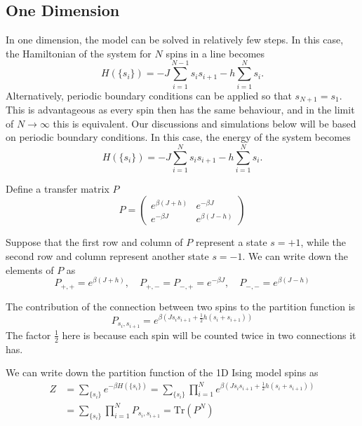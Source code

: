 \documentclass[11pt]{article}
\begin{document}
	\subsection{One Dimension}
	
	In one dimension, the model can be solved in relatively few steps. In this case, the Hamiltonian of the system for $N$ spins in a line becomes
	\begin{equation}
		H(\{s_i\}) = -J \sum_{i=1}^{N-1} s_i s_{i+1} -h\sum_{i=1}^N s_i.
	\end{equation}
	Alternatively, periodic boundary conditions can be applied so that $s_{N+1} = s_1$. This is advantageous as every spin then has the same behaviour, and in the limit of $N \to \infty$ this is equivalent. Our discussions and simulations below will be based on periodic boundary conditions. In this case, the energy of the system becomes
	\begin{equation} \label{eq:Energy1D}
		H(\{s_i\}) = -J \sum_{i=1}^{N} s_i s_{i+1} -h\sum_{i=1}^N s_i.
	\end{equation}

	Define a transfer matrix $P$
	\begin{equation} \label{eq:MatrixP}
		P = \begin{pmatrix}
			e^{\beta(J+h)} & e^{-\beta J} \\
			e^{-\beta J} & e^{\beta(J-h)}
		\end{pmatrix}
	\end{equation}

	Suppose that the first row and column of $P$ represent a state $s = +1$, while the second row and column represent another state $s = -1$. We can write down the elements of $P$ as
	\begin{equation} \label{eq:MatrixPElements}
		P_{+,+} = e^{\beta(J+h)}, \quad P_{+,-} = P_{-,+} = e^{-\beta J}, \quad P_{-,-} = e^{\beta(J-h)}
	\end{equation}

	The contribution of the connection between two spins to the partition function is
	\begin{equation} \label{eq:PartitionFunction1DGeneral2SpinsConnection}
		P_{s_i, s_{i+1}} = e^{\beta(J s_i s_{i+1} + \frac12h(s_i + s_{i+1}))}
	\end{equation}
	The factor $\frac12$ here is because each spin will be counted twice in two connections it has.

	We can write down the partition function of the 1D Ising model spins as
	\begin{equation} \label{eq:PartitionFunction1DGeneral}
		\begin{aligned}
			Z &= \sum_{\{s_i\}} e^{-\beta H(\{s_i\})} = \sum_{\{s_i\}} \prod_{i=1}^{N} e^{\beta(J s_i s_{i+1} + \frac12h(s_i + s_{i+1}))} \\
			&= \sum_{\{s_i\}} \prod_{i=1}^{N} P_{s_i, s_{i+1}} = \mathrm{Tr}(P^N) \\
		\end{aligned}
	\end{equation}
\end{document}
